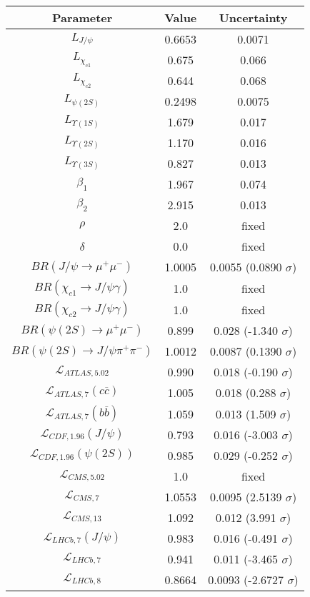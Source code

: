 \begin{table}[h!]
\centering
\begin{tabular}{c|c|c}
Parameter & Value & Uncertainty \\
\hline
$L_{J/\psi}$ & 0.6653 & 0.0071 \\
$L_{\chi_{c1}}$ & 0.675 & 0.066 \\
$L_{\chi_{c2}}$ & 0.644 & 0.068 \\
$L_{\psi(2S)}$ & 0.2498 & 0.0075 \\
$L_{\Upsilon(1S)}$ & 1.679 & 0.017 \\
$L_{\Upsilon(2S)}$ & 1.170 & 0.016 \\
$L_{\Upsilon(3S)}$ & 0.827 & 0.013 \\
$\beta_1$ & 1.967 & 0.074 \\
$\beta_2$ & 2.915 & 0.013 \\
$\rho$ & 2.0 & fixed \\
$\delta$ & 0.0 & fixed \\
$BR(J/\psi\rightarrow\mu^+\mu^-)$ & 1.0005 & 0.0055 (0.0890 $\sigma$) \\
$BR(\chi_{c1}\rightarrow J/\psi\gamma)$ & 1.0 & fixed \\
$BR(\chi_{c2}\rightarrow J/\psi\gamma)$ & 1.0 & fixed \\
$BR(\psi(2S)\rightarrow\mu^+\mu^-)$ & 0.899 & 0.028 (-1.340 $\sigma$) \\
$BR(\psi(2S)\rightarrow J/\psi\pi^+\pi^-)$ & 1.0012 & 0.0087 (0.1390 $\sigma$) \\
$\mathcal L_{ATLAS,5.02}$ & 0.990 & 0.018 (-0.190 $\sigma$) \\
$\mathcal L_{ATLAS,7}(c\overline c)$ & 1.005 & 0.018 (0.288 $\sigma$) \\
$\mathcal L_{ATLAS,7}(b\overline b)$ & 1.059 & 0.013 (1.509 $\sigma$) \\
$\mathcal L_{CDF,1.96}(J/\psi)$ & 0.793 & 0.016 (-3.003 $\sigma$) \\
$\mathcal L_{CDF,1.96}(\psi(2S))$ & 0.985 & 0.029 (-0.252 $\sigma$) \\
$\mathcal L_{CMS,5.02}$ & 1.0 & fixed \\
$\mathcal L_{CMS,7}$ & 1.0553 & 0.0095 (2.5139 $\sigma$) \\
$\mathcal L_{CMS,13}$ & 1.092 & 0.012 (3.991 $\sigma$) \\
$\mathcal L_{LHCb,7}(J/\psi)$ & 0.983 & 0.016 (-0.491 $\sigma$) \\
$\mathcal L_{LHCb,7}$ & 0.941 & 0.011 (-3.465 $\sigma$) \\
$\mathcal L_{LHCb,8}$ & 0.8664 & 0.0093 (-2.6727 $\sigma$) \\

\end{tabular}
\end{table}
